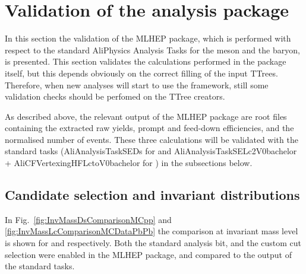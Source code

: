 \section{Validation of the analysis package}
\label{sec:validation}

In this section the validation of the MLHEP package, which is performed with respect to the standard AliPhysics Analysis Tasks for the \Ds meson and the \Lc baryon, is presented. This section validates the calculations performed in the package itself, but this depends obviously on the correct filling of the input TTrees. Therefore, when new analyses will start to use the framework, still some validation checks should be perfomed on the TTree creators.

As described above, the relevant output of the MLHEP package are root files containing the extracted raw yields, prompt and feed-down efficiencies, and the normalised number of events. These three calculations will be validated with the standard tasks (AliAnalysisTaskSEDs for \Ds and AliAnalysisTaskSELc2V0bachelor + AliCFVertexingHFLctoV0bachelor for \Lc) in the subsections below.

\subsection{Candidate selection and invariant distributions}
\label{subsec:invMassValidation}

In Fig.~\ref{fig:InvMassDsComparisonMCpp} and \ref{fig:InvMassLcComparisonMCDataPbPb} the comparison at invariant mass level is shown for \Ds and \Lc respectively. Both the standard analysis bit, and the custom cut selection were enabled in the MLHEP package, and compared to the output of the standard tasks.

